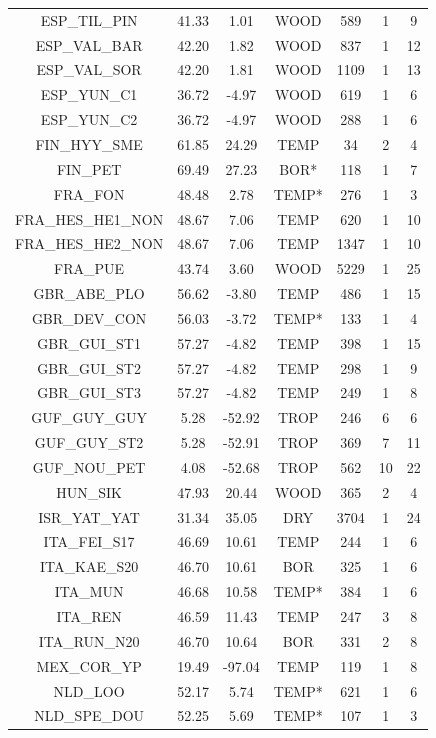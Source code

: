 \documentclass[11pt,twoside]{reedthesis}
\begin{document}
\begin{longtable}[t]{ccccccc}
ESP\_TIL\_PIN & 41.33 & 1.01 & WOOD & 589 & 1 & 9\\
ESP\_VAL\_BAR & 42.20 & 1.82 & WOOD & 837 & 1 & 12\\
ESP\_VAL\_SOR & 42.20 & 1.81 & WOOD & 1109 & 1 & 13\\
ESP\_YUN\_C1 & 36.72 & -4.97 & WOOD & 619 & 1 & 6\\
ESP\_YUN\_C2 & 36.72 & -4.97 & WOOD & 288 & 1 & 6\\
FIN\_HYY\_SME & 61.85 & 24.29 & TEMP & 34 & 2 & 4\\
FIN\_PET & 69.49 & 27.23 & BOR* & 118 & 1 & 7\\
FRA\_FON & 48.48 & 2.78 & TEMP* & 276 & 1 & 3\\
FRA\_HES\_HE1\_NON & 48.67 & 7.06 & TEMP & 620 & 1 & 10\\
FRA\_HES\_HE2\_NON & 48.67 & 7.06 & TEMP & 1347 & 1 & 10\\
FRA\_PUE & 43.74 & 3.60 & WOOD & 5229 & 1 & 25\\
GBR\_ABE\_PLO & 56.62 & -3.80 & TEMP & 486 & 1 & 15\\
GBR\_DEV\_CON & 56.03 & -3.72 & TEMP* & 133 & 1 & 4\\
GBR\_GUI\_ST1 & 57.27 & -4.82 & TEMP & 398 & 1 & 15\\
GBR\_GUI\_ST2 & 57.27 & -4.82 & TEMP & 298 & 1 & 9\\
GBR\_GUI\_ST3 & 57.27 & -4.82 & TEMP & 249 & 1 & 8\\
GUF\_GUY\_GUY & 5.28 & -52.92 & TROP & 246 & 6 & 6\\
GUF\_GUY\_ST2 & 5.28 & -52.91 & TROP & 369 & 7 & 11\\
GUF\_NOU\_PET & 4.08 & -52.68 & TROP & 562 & 10 & 22\\
HUN\_SIK & 47.93 & 20.44 & WOOD & 365 & 2 & 4\\
ISR\_YAT\_YAT & 31.34 & 35.05 & DRY & 3704 & 1 & 24\\
ITA\_FEI\_S17 & 46.69 & 10.61 & TEMP & 244 & 1 & 6\\
ITA\_KAE\_S20 & 46.70 & 10.61 & BOR & 325 & 1 & 6\\
ITA\_MUN & 46.68 & 10.58 & TEMP* & 384 & 1 & 6\\
ITA\_REN & 46.59 & 11.43 & TEMP & 247 & 3 & 8\\
ITA\_RUN\_N20 & 46.70 & 10.64 & BOR & 331 & 2 & 8\\
MEX\_COR\_YP & 19.49 & -97.04 & TEMP & 119 & 1 & 8\\
NLD\_LOO & 52.17 & 5.74 & TEMP* & 621 & 1 & 6\\
NLD\_SPE\_DOU & 52.25 & 5.69 & TEMP* & 107 & 1 & 3\\

\end{longtable}
\end{document}
